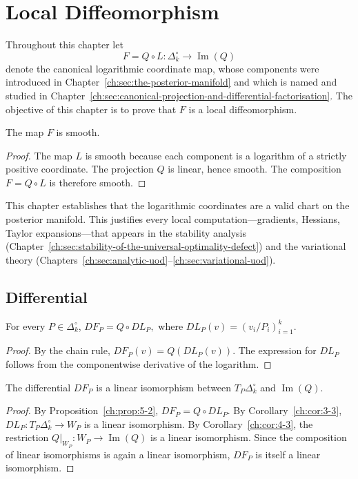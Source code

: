 \chapter[Local Diffeomorphism]{Local Diffeomorphism}\label{ch:sec:local-diffeomorphism}
Throughout this chapter let
\[
F = Q \circ L : \Delta_k^\circ \longrightarrow \operatorname{Im}(Q)
\]
denote the canonical logarithmic coordinate map, whose components were introduced in Chapter~\ref{ch:sec:the-posterior-manifold} and which is named and studied in Chapter~\ref{ch:sec:canonical-projection-and-differential-factorisation}.
The objective of this chapter is to prove that \(F\) is a local diffeomorphism.

\begin{proposition}[Smoothness]
\label{ch:prop:5-1}
The map \(F\) is smooth.
\end{proposition}
\begin{proof}
The map \(L\) is smooth because each component is a logarithm of a strictly positive coordinate.
The projection \(Q\) is linear, hence smooth.
The composition \(F = Q \circ L\) is therefore smooth. 
\end{proof}

This chapter establishes that the logarithmic coordinates are a valid chart on the posterior manifold. This justifies every local computation---gradients, Hessians, Taylor expansions---that appears in the stability analysis (Chapter~\ref{ch:sec:stability-of-the-universal-optimality-defect}) and the variational theory (Chapters~\ref{ch:sec:analytic-uod}--\ref{ch:sec:variational-uod}).

\section{Differential}\label{ch:sec:differential}
\begin{proposition}
\label{ch:prop:5-2}
For every \(P \in \Delta_k^\circ\),
$DF_P = Q \circ DL_P,$
where \(DL_P(v) = (v_i / P_i)_{i=1}^k\).
\end{proposition}
\begin{proof}
By the chain rule,
$DF_P(v) = Q(DL_P(v)).$
The expression for \(DL_P\) follows from the componentwise derivative of the logarithm. 
\end{proof}
\begin{corollary}
\label{ch:cor:5-3}
The differential \(DF_P\) is a linear isomorphism between \(T_P \Delta_k^\circ\) and \(\operatorname{Im}(Q)\).
\end{corollary}
\begin{proof}
By Proposition~\ref{ch:prop:5-2}, \(DF_P = Q \circ DL_P\).
By Corollary~\ref{ch:cor:3-3}, \(DL_P : T_P \Delta_k^\circ \to W_P\) is a linear isomorphism.
By Corollary~\ref{ch:cor:4-3}, the restriction \(Q|_{W_P} : W_P \to \operatorname{Im}(Q)\) is a linear isomorphism.
Since the composition of linear isomorphisms is again a linear isomorphism,
\(DF_P\) is itself a linear isomorphism. 
\end{proof}
